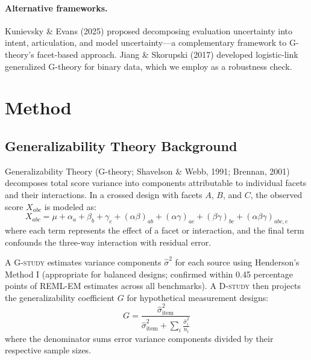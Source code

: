 \documentclass[11pt]{article}
\newcommand{\Gstudy}{\textsc{G-study}}
\newcommand{\Dstudy}{\textsc{D-study}}
\begin{document}
\paragraph{Alternative frameworks.}
Kunievsky \& Evans (2025) proposed decomposing evaluation uncertainty into intent, articulation, and model uncertainty---a complementary framework to G-theory's facet-based approach.
Jiang \& Skorupski (2017) developed logistic-link generalized G-theory for binary data, which we employ as a robustness check.

\section{Method}
\label{sec:method}

\subsection{Generalizability Theory Background}

Generalizability Theory (G-theory; Shavelson \& Webb, 1991; Brennan, 2001) decomposes total score variance into components attributable to individual facets and their interactions.
In a crossed design with facets $A$, $B$, and $C$, the observed score $X_{abc}$ is modeled as:
\begin{equation}
X_{abc} = \mu + \alpha_a + \beta_b + \gamma_c + (\alpha\beta)_{ab} + (\alpha\gamma)_{ac} + (\beta\gamma)_{bc} + (\alpha\beta\gamma)_{abc,e}
\end{equation}
where each term represents the effect of a facet or interaction, and the final term confounds the three-way interaction with residual error.

A \Gstudy{} estimates variance components $\hat{\sigma}^2$ for each source using Henderson's Method I (appropriate for balanced designs; confirmed within 0.45 percentage points of REML-EM estimates across all benchmarks).
A \Dstudy{} then projects the generalizability coefficient $G$ for hypothetical measurement designs:
\begin{equation}
G = \frac{\hat{\sigma}^2_{\text{item}}}{\hat{\sigma}^2_{\text{item}} + \sum_i \frac{\hat{\sigma}^2_i}{n_i}}
\end{equation}
where the denominator sums error variance components divided by their respective sample sizes.
\end{document}
